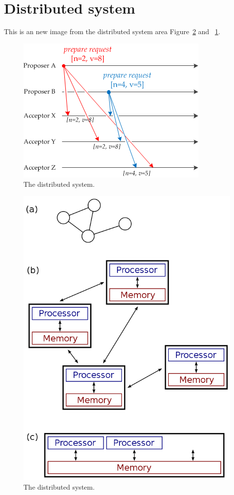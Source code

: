 \section{Distributed system}

This is an new image from the distributed system area Figure~\ref{fig:ds} and ~\ref{fig:ds-2}.

  \begin{figure}
    \centering
	\includegraphics[width=1\linewidth]{ds-2.png}
	\caption{\textmd{The distributed system}.}\label{fig:ds-2}
  \end{figure}

  \begin{figure}
    \centering
	\includegraphics[width=1\linewidth]{dist.png}
	\caption{\textmd{The distributed system}.}\label{fig:ds}
  \end{figure}
